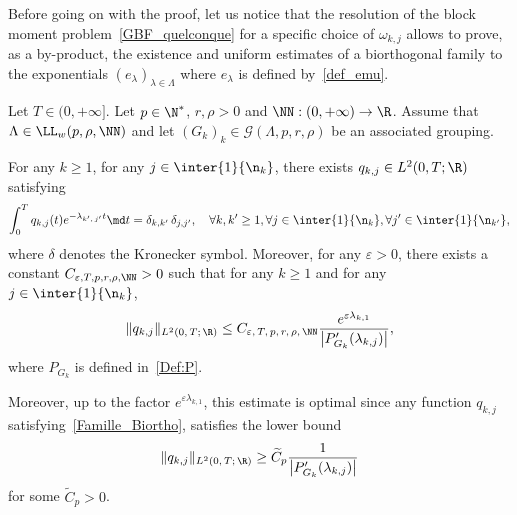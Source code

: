 Before going on with the proof, let us notice that the resolution of the block moment problem~\eqref{GBF_quelconque} for a specific choice of $\omega_{k,j}$ allows to prove, as a by-product, the existence and uniform estimates of a biorthogonal family to the exponentials $(e_\lambda)_{ \lambda \in \Lambda}$ where $e_\lambda$ is defined by~\eqref{def_emu}.
\begin{coro} \label{Coro:FamilleBiorthogonale}
Let $T \in (0,+\infty]$. Let $p \in \N^*$, $r, \rho > 0$ and $\NN : (0,+\infty) \to \R$. Assume that $\Lambda \in \LL_w(p,\rho, \NN)$ and let $(G_k)_k\in \mathcal{G}(\Lambda,p,r,\rho)$ be an associated grouping.

For any $k \geq 1$, for any $j \in \inter{1}{\n_k}$, there exists $q_{k,j} \in L^2(0,T ; \R)$ satisfying
\begin{equation}\label{Famille_Biortho}
\int_0^T q_{k,j}(t) e^{-\lambda_{k',\,j'} t } \md t = \delta_{k,k'}\,\delta_{j,j'}, \quad \forall k, k' \geq 1, \forall j \in \inter{1}{\n_{k}}, \forall j' \in \inter{1}{\n_{k'}},
\end{equation}
where $\delta$ denotes the Kronecker symbol. Moreover, for any $\varepsilon > 0$, there exists a constant $C_{\varepsilon, T, p, r, \rho, \NN} >0$ such that for any $k \geq 1$ and for any $j \in \inter{1}{\n_k}$,
\begin{equation*}\label{Estimee_Famille_Biortho}
\| q_{k,j} \|_{L^2(0,\,T ;\,\R)} \leq C_{\varepsilon,\,T,\,p,\,r,\,\rho,\,\NN} \frac{e^{\varepsilon \lambda_{k,1}}}{\left| P_{G_k}'(\lambda_{k,j}) \right| },
\end{equation*}
where $P_{G_k}$ is defined in~\eqref{Def:P}.

Moreover, up to the factor $e^{\varepsilon \lambda_{k,1}}$, this estimate is optimal since any function $q_{k,j}$ satisfying~\eqref{Famille_Biortho}, satisfies the lower bound
\[
\| q_{k,j} \|_{L^2(0,\,T ;\,\R)} \geq \widetilde{C}_{p} \frac{1}{\left| P_{G_k}'(\lambda_{k,j}) \right| }
\]
for some $\widetilde{C}_p >0$.
\end{coro}



